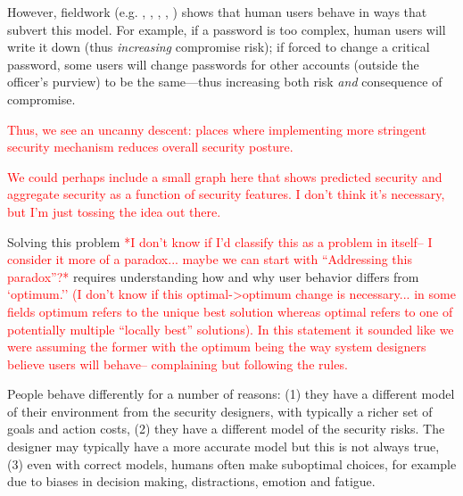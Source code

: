 \documentclass{acm_proc_article-sp}
\newcommand{\ignore}[1] {}
\begin{document}
However, fieldwork (e.g. \cite{blythe2013circumvention}, \cite{DP00},
\cite{florencio2007large}, \cite{gaw2006password},
\cite{riley2006password}) shows that human users behave in ways that
subvert this model.  For example, if a password is too complex, human
users will write it down (thus {\em increasing} compromise risk); if
forced to change a critical password, some users will change passwords
for other accounts (outside the officer's purview) to be the
same---thus increasing both risk {\em and} consequence of compromise.

\textcolor{red}{Thus, we see an uncanny descent: places where implementing more 
stringent security mechanism reduces overall security posture.}

\ignore{Thus, what seems to be a simple monotonic relationship may in fact harbor
what graphics specialists call {\em uncanny valleys}: places where
dialing up the controls actually decreases overall security posture.}

\textcolor{red}{We could perhaps include a small graph here that shows 
predicted security and aggregate security as a function of security features. 
I don't think it's necessary, but I'm just tossing the idea out there.}

Solving this problem \textcolor{red}{*I don't know if I'd classify this as a problem in itself-- 
I consider it more of a paradox... maybe we can start with ``Addressing this paradox''?*} requires understanding how and why user behavior
differs from \ignore{``optimal.''} \textcolor{red}{`optimum.'' (I don't know if this 
optimal->optimum change is necessary... in some fields optimum refers to
the unique best solution whereas optimal refers to one of potentially multiple 
``locally best'' solutions). In this 
statement it sounded like we were assuming the former with the optimum 
being the way system designers believe users will behave-- complaining but 
following the rules.}

People behave differently for a number of reasons: (1) they have a
different model of their environment from the security designers, with
typically a richer set of goals and action costs, (2) they have a
different model of the security risks. The designer may typically have
a more accurate model but this is not always true, (3) even with
correct models, humans often make suboptimal choices, for example due
to biases in decision making, distractions, emotion and fatigue.
\end{document}
